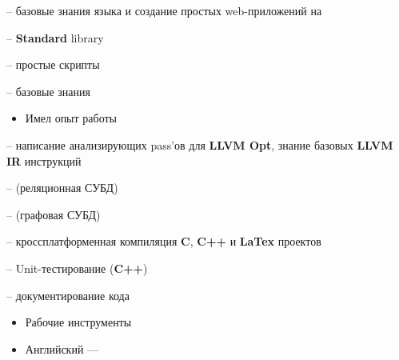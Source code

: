 \documentclass[10pt,a4paper,ragged2e,withhyper]{custom-altacv}
\begin{document}
\begin{paracol}{2}
 -- базовые знания языка и создание простых web-приложений на 

 -- \textbf{Standard} library
\vspace{1ex}

 -- простые скрипты
\vspace{1ex}

 -- базовые знания
\vspace{.5ex}

\divider

\begin{itemize}
	\item \textcolor{emphasis}{Имел опыт работы}
\end{itemize}

 -- написание анализирующих pass'ов для \textbf{LLVM Opt}, знание базовых \textbf{LLVM IR} инструкций
\vspace{1ex}

 --  (реляционная СУБД)
\vspace{-.2ex}

 --  (графовая СУБД)
\vspace{1ex}

 -- кроссплатформенная компиляция \textbf{C}, \textbf{C++} и \textbf{LaTex} проектов
\vspace{1ex}

 -- Unit-тестирование (\textbf{C++})
\vspace{1ex}

 -- документирование кода
\vspace{1ex}

\vspace{1ex}

\divider

\begin{itemize}
	\item\textcolor{emphasis}{Рабочие инструменты}
\end{itemize}





\begin{itemize}
	\item Английский --- 
\end{itemize}

\end{paracol}
\end{document}
